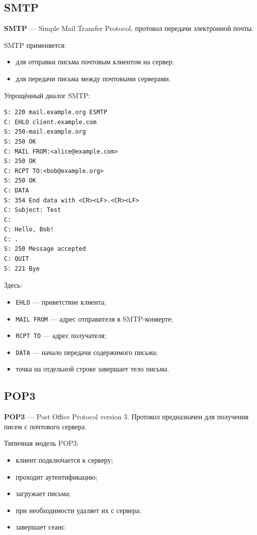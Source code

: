 \documentclass[12pt,a4paper]{article}
\begin{document}
\subsection{SMTP}

\textbf{SMTP} --- Simple Mail Transfer Protocol, протокол передачи электронной почты.

SMTP применяется:
\begin{itemize}
    \item для отправки письма почтовым клиентом на сервер;
    \item для передачи письма между почтовыми серверами.
\end{itemize}

Упрощённый диалог SMTP:
\begin{lstlisting}
S: 220 mail.example.org ESMTP
C: EHLO client.example.com
S: 250-mail.example.org
S: 250 OK
C: MAIL FROM:<alice@example.com>
S: 250 OK
C: RCPT TO:<bob@example.org>
S: 250 OK
C: DATA
S: 354 End data with <CR><LF>.<CR><LF>
C: Subject: Test
C:
C: Hello, Bob!
C: .
S: 250 Message accepted
C: QUIT
S: 221 Bye
\end{lstlisting}

Здесь:
\begin{itemize}
    \item \texttt{EHLO} --- приветствие клиента;
    \item \texttt{MAIL FROM} --- адрес отправителя в SMTP-конверте;
    \item \texttt{RCPT TO} --- адрес получателя;
    \item \texttt{DATA} --- начало передачи содержимого письма;
    \item точка на отдельной строке завершает тело письма.
\end{itemize}

\subsection{POP3}

\textbf{POP3} --- Post Office Protocol version 3. Протокол предназначен для получения писем с почтового сервера.

Типичная модель POP3:
\begin{itemize}
    \item клиент подключается к серверу;
    \item проходит аутентификацию;
    \item загружает письма;
    \item при необходимости удаляет их с сервера;
    \item завершает сеанс.
\end{itemize}
\end{document}
